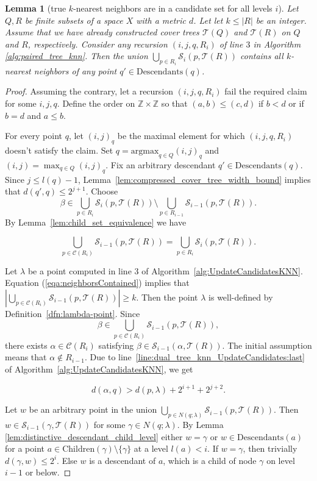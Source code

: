 \documentclass[a4paper,UKenglish,cleveref, autoref]{lipics-v2019}
\numberwithin{algocf}{section}
\theoremstyle{definition}
\theoremstyle{definition}
\theoremstyle{definition}
\theoremstyle{plain}
\newtheorem{lem}[algocf]{Lemma}
\newcommand{\Child}{\mathrm{Children}}
\newcommand{\Desc}{\mathrm{Descendants}}
\newcommand{\Z}{\mathbb{Z}}
\newcommand{\C}{\mathcal{C}}
\newcommand{\T}{\mathcal{T}}
\newcommand{\Sd}{\mathcal{S}}
\newcommand{\la}{\lambda}
\begin{document}
\begin{lem}[true $k$-nearest neighbors are in a candidate set for all levels $i$]
\label{lem:cover_tree_dual_knn_correct}
Let $Q,R$ be finite subsets of a space $X$ with a metric $d$.
Let let $k\leq |R|$ be an integer. 
Assume that we have already constructed cover trees $\T(Q)$ and $\T(R)$ on $Q$ and $R$, respectively.
Consider any recursion $(i,j,q,R_i)$ of line $3$ in Algorithm \ref{alg:paired_tree_knn}. 
Then the union $\bigcup_{p \in R_i}\Sd_i(p, \T(R))$ contains all $k$-nearest neighbors of any point $q' \in \Desc(q)$.
\end{lem}
\begin{proof}
Assuming the contrary, let a recursion $(i,j,q,R_i)$ fail the required claim for some $i,j,q$. 
Define the order on $\Z \times \Z$ so that $(a,b) \leq (c,d)$ if $b < d$ or if $b = d$ and $a \leq b$. 
\medskip

For every point $q$, let $(i,j)_q$ be the maximal element for which $(i,j,q,R_i)$ doesn't satisfy the claim. 
Set $q = \mathrm{argmax}_{q \in Q}(i,j)_q$ and $(i,j) = \max_{q \in Q}(i,j)_q$.
Fix an arbitrary descendant $q' \in \Desc(q)$. 
Since $j \leq l(q) - 1$, Lemma~\ref{lem:compressed_cover_tree_width_bound} implies that $d(q',q) \leq 2^{j+1}$.
Choose
$$\beta \in \bigcup_{p \in R_i}\Sd_i(p, \T(R)) \setminus \bigcup_{p \in R_{i-1}}\Sd_{i-1}(p, \T(R)).$$ 
By Lemma~\ref{lem:child_set_equivalence} we have 
\begin{ceqn}
\begin{equation}
\label{eqa:neighborsContained}
\bigcup_{p \in \C(R_i)}\Sd_{i-1}(p, \T(R)) = \bigcup_{p \in R_i}\Sd_{i}(p, \T(R)).
\end{equation}
\end{ceqn}

Let $\lambda$ be a point computed in line 3 of Algorithm~\ref{alg:UpdateCandidatesKNN}. 
Equation (\ref{eqa:neighborsContained}) implies that $|\bigcup_{p \in \C(R_i)}\Sd_{i-1}(p, \T(R))| \geq k$.
Then the point $\lambda$ is well-defined by Definition~\ref{dfn:lambda-point}. 
Since $$\beta \in \bigcup_{p \in \C(R_i)}\Sd_{i-1}(p, \T(R)),$$ there exists $\alpha \in \C(R_i)$ satisfying $\beta \in \Sd_{i-1}(\alpha, \T(R))$. 
The initial assumption means that $\alpha \notin R_{i-1}$. 
Due to line~\ref{line:dual_tree_knn_UpdateCandidates:last} of Algorithm~\ref{alg:UpdateCandidatesKNN}, we get
\begin{ceqn}
\begin{equation}
\label{eqa:neighborsContained2}
   d(\alpha, q) > d(p, \lambda) + 2^{i+1} + 2^{j+2}.
\end{equation}
\end{ceqn}
Let $w$ be an arbitrary point in the union $\bigcup_{p \in N(q;\la)}\Sd_{i-1}(p, \T(R))$. 
Then $w \in \Sd_{i-1}(\gamma, \T(R))$ for some $\gamma \in  N(q;\la)$. By Lemma \ref{lem:distinctive_descendant_child_level} either $w = \gamma$ or $w \in \Desc(a)$ for a point $a \in \Child(\gamma) \setminus \{\gamma\}$ at a level $l(a) < i$.
If $w = \gamma$, then trivially $d(\gamma, w) \leq 2^{i}$. Else $w$ is a descendant of $a$, which is a child of node $\gamma$ on level $i-1$ or below.
\medskip


\end{proof}
\end{document}
